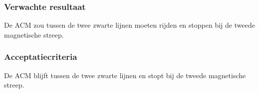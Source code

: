 \subsubsection{Verwachte resultaat}
\begin{flushleft}
    De ACM zou tussen de twee zwarte lijnen moeten rijden en stoppen bij de tweede magnetische streep.
\end{flushleft}
\subsubsection{Acceptatiecriteria}
\begin{flushleft}
    De ACM blijft tussen de twee zwarte lijnen en stopt bij de tweede magnetische streep.
\end{flushleft}

